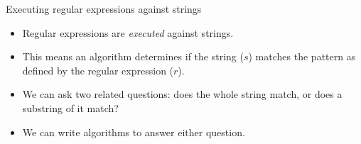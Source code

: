 \begin{frame}{Executing regular expressions against strings}

  \begin{itemize}
    \item Regular expressions are \emph{executed} against strings.
    \item This means an algorithm determines if the string ($s$) matches the pattern as defined by the regular expression ($r$).
    \item We can ask two related questions: does the whole string match, or does a substring of it match?
    \item We can write algorithms to answer either question.
  \end{itemize}
\end{frame}